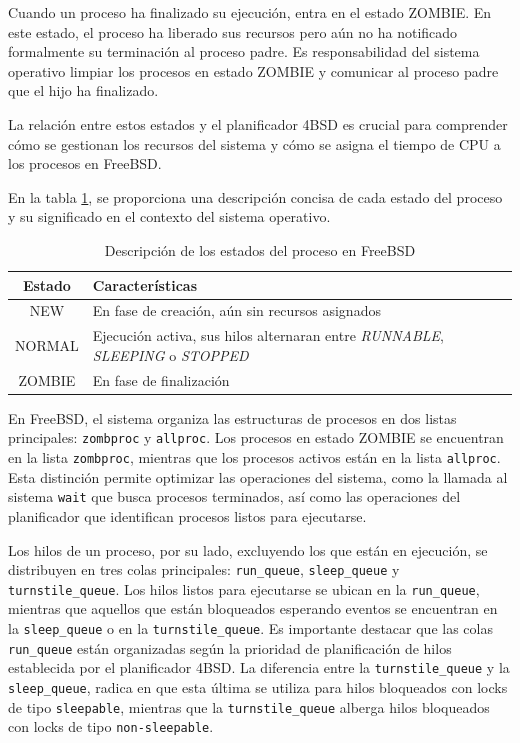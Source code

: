 Cuando un proceso ha finalizado su ejecución, entra en el estado ZOMBIE. En este estado, el proceso ha liberado sus recursos pero aún no ha notificado formalmente su terminación al proceso padre. Es responsabilidad del sistema operativo limpiar los procesos en estado ZOMBIE y comunicar al proceso padre que el hijo ha finalizado.

La relación entre estos estados y el planificador 4BSD es crucial para comprender cómo se gestionan los recursos del sistema y cómo se asigna el tiempo de CPU a los procesos en FreeBSD.

En la tabla \ref{tabla:estados-proceso}, se proporciona una descripción concisa de cada estado del proceso y su significado en el contexto del sistema operativo.

\begin{table}[H]
    \centering
    \begin{tabular}{|c|p{}|}
        \hline
        \textbf{Estado} & \textbf{Características}                                                                             \\
        \hline
        NEW             & En fase de creación, aún sin recursos asignados                                                      \\
        \hline
        NORMAL          & Ejecución activa, sus hilos alternaran entre \textit{RUNNABLE}, \textit{SLEEPING} o \textit{STOPPED} \\
        \hline
        ZOMBIE          & En fase de finalización                                                                              \\
        \hline
    \end{tabular}
    \caption{Descripción de los estados del proceso en FreeBSD}
    \label{tabla:estados-proceso}
\end{table}

En FreeBSD, el sistema organiza las estructuras de procesos en dos listas principales: \texttt{zombproc} y \texttt{allproc}. Los procesos en estado ZOMBIE se encuentran en la lista \texttt{zombproc}, mientras que los procesos activos están en la lista \texttt{allproc}. Esta distinción permite optimizar las operaciones del sistema, como la llamada al sistema \texttt{wait} que busca procesos terminados, así como las operaciones del planificador que identifican procesos listos para ejecutarse.

Los hilos de un proceso, por su lado, excluyendo los que están en ejecución, se distribuyen en tres colas principales: \texttt{run\_queue}, \texttt{sleep\_queue} y \texttt{turnstile\_queue}. Los hilos listos para ejecutarse se ubican en la \texttt{run\_queue}, mientras que aquellos que están bloqueados esperando eventos se encuentran en la \texttt{sleep\_queue} o en la \texttt{turnstile\_queue}. Es importante destacar que las colas \texttt{run\_queue} están organizadas según la prioridad de planificación de hilos establecida por el planificador 4BSD. La diferencia entre la \texttt{turnstile\_queue} y la \texttt{sleep\_queue}, radica en que esta última se utiliza para hilos bloqueados con locks de tipo \texttt{sleepable}, mientras que la \texttt{turnstile\_queue} alberga hilos bloqueados con locks de tipo \texttt{non-sleepable}.

